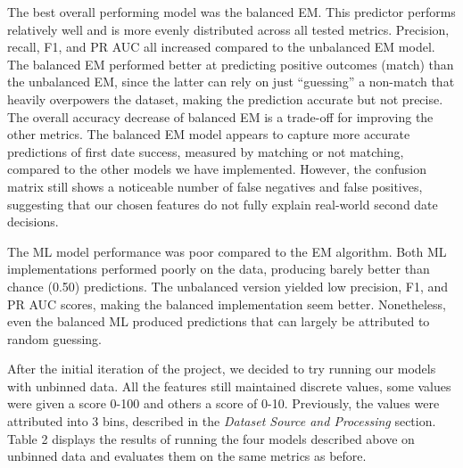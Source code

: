 \documentclass{article}
\begin{document}
The best overall performing model was the balanced EM. This predictor performs relatively well and is more evenly distributed across all tested metrics. Precision, recall, F1, and PR AUC all increased compared to the unbalanced EM model. The balanced EM performed better at predicting positive outcomes (match) than the unbalanced EM, since the latter can rely on just “guessing” a non-match that heavily overpowers the dataset, making the prediction accurate but not precise. The overall accuracy decrease of balanced EM is a trade-off for improving the other metrics. The balanced EM model appears to capture more accurate predictions of first date success, measured by matching or not matching, compared to the other models we have implemented. However, the confusion matrix still shows a noticeable number of false negatives and false positives, suggesting that our chosen features do not fully explain real-world second date decisions.

The ML model performance was poor compared to the EM algorithm. Both ML implementations performed poorly on the data, producing barely better than chance (0.50) predictions. The unbalanced version yielded low precision, F1, and PR AUC scores, making the balanced implementation seem better. Nonetheless, even the balanced ML produced predictions that can largely be attributed to random guessing. 

After the initial iteration of the project, we decided to try running our models with unbinned data. All the features still maintained discrete values, some values were given a score 0-100 and others a score of 0-10. Previously, the values were attributed into 3 bins, described in the \emph{Dataset Source and Processing} section. Table 2 displays the results of running the four models described above on unbinned data and evaluates them on the same metrics as before.  
\end{document}
